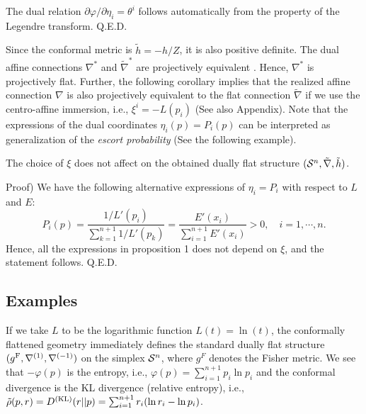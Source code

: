 \documentclass{llncs}
\begin{document}
The dual relation $\partial \varphi/\partial \eta_i = \theta^i$ follows 
automatically from the property of the Legendre transform.
\hfill Q.E.D.

\begin{remark}
\label{rem:rem2}
Since the conformal metric is $\tilde h=-h/Z$, 
it is also positive definite.
The dual affine connections $\nabla^*$ and $\tilde \nabla^*$ 
are projectively equivalent \cite{Kurose94}. 
Hence, $\nabla^*$ is projectively flat. %
Further, the following corollary implies that 
the realized affine connection $\nabla$ is also projectively equivalent to
the flat connection $\tilde \nabla$ 
if we use the centro-affine immersion, 
i.e., $\xi^i=-L(p_i)$ \cite{NS,Kurose94} (See also Appendix).
Note that the expressions of the dual coordinates $\eta_i(p)=P_i(p)$ 
can be interpreted as generalization of 
the {\em escort probability} \cite{Tsallis09} (See the following example). 
\end{remark}
\begin{corollary}
The choice of $\xi$ does not affect on the obtained dually flat structure 
$({\cal S}^n,\tilde \nabla, \tilde h)$.
\end{corollary}
Proof)
We have the following alternative expressions of $\eta_i=P_i$ 
with respect to $L$ and $E$:
\[
	P_i(p)=\frac{1/L'(p_i)}{\displaystyle \sum_{k=1}^{n+1}1/L'(p_k)}
=\frac{E'(x_i)}{\displaystyle \sum_{i=1}^{n+1} E'(x_i)} >0, \quad i=1,\cdots,n.
\]
Hence, all the expressions in proposition 1 does not depend on $\xi$, and 
the statement follows.
\hfill Q.E.D.

\subsection{Examples}
\label{sec:example}
If we take $L$ to be the logarithmic function $L(t)=\ln (t)$, 
the conformally flattened geometry immediately defines 
the standard dually flat structure %
$(g^{\rm F},\nabla^{(1)},\nabla^{(-1)})$ on the simplex ${\cal S}^n$,
where $g^F$ denotes the Fisher metric.
We see that $-\varphi(p)$ is the entropy, i.e., 
$\varphi(p)=\sum_{i=1}^{n+1} p_i \ln p_i$ and 
the conformal divergence is the KL divergence (relative entropy), i.e., 
$\tilde \rho(p,r)=D^{({\rm KL})}(r||p)=\sum_{i=1}^{n+1} r_i (\ln r_i-\ln p_i)$.
\end{document}
